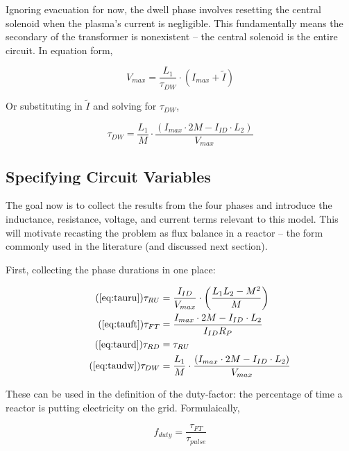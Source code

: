 Ignoring evacuation for now, the dwell phase involves resetting the central solenoid when the plasma's current is negligible. This fundamentally means the secondary of the transformer is nonexistent -- the central solenoid is the entire circuit. In equation form,

\begin{equation}
	V_{max} = \frac{L_1}{\tau_{DW}} \cdot \left( I_{max} + \tilde I \right) 
\end{equation}

Or substituting in $\tilde I$ and solving for $\tau_{DW}$,

\begin{equation}
	\label{eq:taudw}
	\tau_{DW} = \frac{L_1}{M} \cdot \frac{ \left( I_{max} \cdot 2 M - I_{ID} \cdot  L_2 \right) }{V_{max}}
\end{equation}

\subsection{Specifying Circuit Variables}

The goal now is to collect the results from the four phases and introduce the inductance, resistance, voltage, and current terms relevant to this model. This will motivate recasting the problem as flux balance in a reactor -- the form commonly used in the literature (and discussed next section).

First, collecting the phase durations in one place:

\begin{align}
	\tag{\ref{eq:tauru}}
	\tau_{RU} &= \frac{I_{ID}}{V_{max}} \cdot \left( \frac{ L_1 L_2 - M^2 }{ M } \right) \\
	\tag{\ref{eq:tauft}}
	\tau_{FT} &= \frac{ I_{max} \cdot 2 M - I_{ID} \cdot  L_2 }{I_{ID} R_P} \\
	\tag{\ref{eq:taurd}}
	\tau_{RD} &= \tau_{RU} \\
	\tag{\ref{eq:taudw}}
	\tau_{DW} &= \frac{L_1}{M} \cdot \frac{ \left( I_{max} \cdot 2 M - I_{ID} \cdot  L_2 \right) }{V_{max}}
\end{align}

These can be used in the definition of the duty-factor: the percentage of time a reactor is putting electricity on the grid. Formulaically,

\begin{equation}
	\label{eq:duty}
	f_{duty} = \frac{\tau_{FT}}{\tau_{pulse}}
\end{equation}


